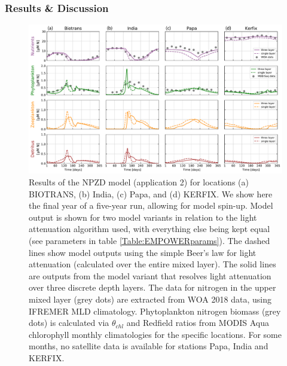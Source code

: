 \documentclass[journal abbreviation, manuscript]{copernicus}
\begin{document}
\subsubsection{Results \& Discussion}
\begin{figure}[t]
\includegraphics[width=15cm]{Figures/firstdraft_plots/02_EMPOWER_lightcomp.pdf}
\caption{Results of the NPZD model (application 2) for locations (a) BIOTRANS, (b) India, (c) Papa, and (d) KERFIX. We show here the final year of a five-year run, allowing for model spin-up. Model output is shown for two model variants in relation to the light attenuation algorithm used, with everything else being kept equal (see parameters in table \ref{Table:EMPOWERparams}). The dashed lines show model outputs using the simple Beer's law for light attenuation (calculated over the entire mixed layer). The solid lines are outputs from the model variant that resolves light attenuation over three discrete depth layers. The data for nitrogen in the upper mixed layer (grey dots) are extracted from WOA 2018 data, using IFREMER MLD climatology. Phytoplankton nitrogen biomass (grey dots) is calculated via $\theta_{chl}$ and Redfield ratios from MODIS Aqua chlorophyll monthly climatologies for the specific locations. For some months,  no satellite data is available for stations Papa, India and KERFIX.}
\label{Figure:ResultsEMPOWER}
\end{figure}
\end{document}

